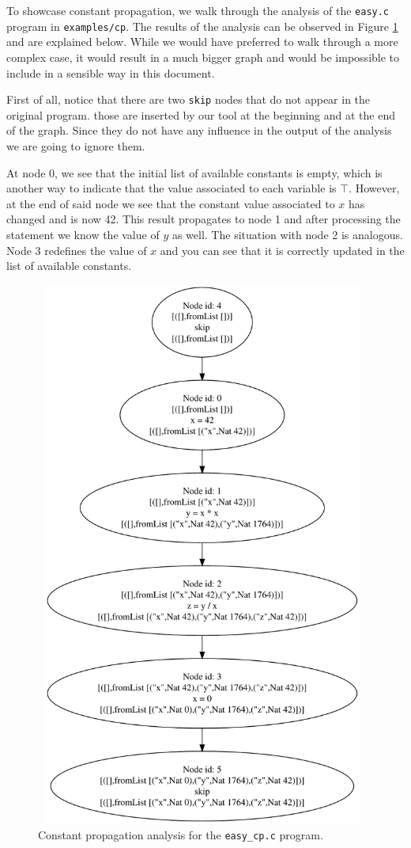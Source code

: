\documentclass{article}
\begin{document}
To showcase constant propagation, we walk through the analysis of the \texttt{easy.c} program in \texttt{examples/cp}. The results of the analysis can be observed in Figure \ref{fig-cp} and are explained below. While we would have preferred to walk through a more complex case, it would result in a much bigger graph and would be impossible to include in a sensible way in this document.

First of all, notice that there are two \texttt{skip} nodes that do not appear in the original program. those are inserted by our tool at the beginning and at the end of the graph. Since they do not have any influence in the output of the analysis we are going to ignore them.

At node 0, we see that the initial list of available constants is empty, which is another way to indicate that the value associated to each variable is $\top$. However, at the end of said node we see that the constant value associated to $x$ has changed and is now 42. This result propagates to node 1 and after processing the statement we know the value of $y$ as well. The situation with node 2 is analogous. Node 3 redefines the value of $x$ and you can see that it is correctly updated in the list of available constants.

\begin{figure}
\centering
\includegraphics[width=11cm, height=18cm]{cp_easy}
\caption{Constant propagation analysis for the \texttt{easy\_cp.c} program.}
\label{fig-cp}
\end{figure}
\end{document}
